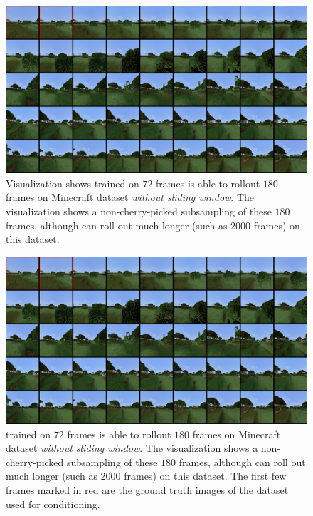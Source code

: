 \begin{figure}[h]
    \centering
    \includegraphics[width=\textwidth]{figures/appendix_vis/df_minecraft_long_1.png}
    \caption{Visualization shows \algo{} trained on $72$ frames is able to rollout $180$ frames on Minecraft dataset \emph{without sliding window}. The visualization shows a non-cherry-picked subsampling of these $180$ frames, although \algo{} can roll out much longer (such as 2000 frames) on this dataset.}
    \label{fig:minecraft_long_0}
\end{figure}
\begin{figure}[h]
    \centering
    \includegraphics[width=\textwidth]{figures/appendix_vis/df_minecraft_long_1.png}
    \caption{\algo{} trained on $72$ frames is able to rollout $180$ frames on Minecraft dataset \emph{without sliding window}. The visualization shows a non-cherry-picked subsampling of these $180$ frames, although \algo{} can roll out much longer (such as 2000 frames) on this dataset. The first few frames marked in red are the ground truth images of the dataset used for conditioning.}
    \label{fig:minecraft_long_1}
\end{figure}
